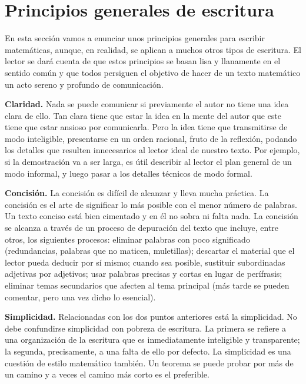 \section{Principios generales de escritura}

En esta sección vamos a enunciar unos principios generales para escribir matemáticas, aunque, en realidad, se aplican a muchos otros tipos de escritura. El lector se dará cuenta de que estos principios se basan lisa y llanamente en el sentido común y que todos persiguen el objetivo de hacer de un texto matemático un acto sereno y profundo de comunicación.

\hspace{5mm}\textbf{Claridad.}
Nada se puede comunicar si previamente el autor no tiene una idea clara de ello.
Tan clara tiene que estar la idea en la mente del autor que este tiene que estar ansioso por comunicarla.
Pero la idea tiene que transmitirse de modo inteligible, presentarse en un orden racional, fruto de la reflexión, podando los detalles que resulten innecesarios al lector ideal de nuestro texto.
Por ejemplo, si la demostración va a ser larga, es útil describir al lector el plan general de un modo informal, y luego pasar a los detalles técnicos de modo formal.

\hspace{5mm}\textbf{Concisión.}
La concisión es difícil de alcanzar y lleva mucha práctica.
La concisión es el arte de significar lo más posible con el menor número de palabras.
Un texto conciso está bien cimentado y en él no sobra ni falta nada.
La concisión se alcanza a través de un proceso de depuración del texto que incluye, entre otros, los siguientes procesos:
eliminar palabras con poco significado (redundancias, palabras que no maticen, muletillas);
descartar el material que el lector pueda deducir por sí mismo;
cuando sea posible, sustituir subordinadas adjetivas por adjetivos;
usar palabras precisas y cortas en lugar de perífrasis;
eliminar temas secundarios que afecten al tema principal (más tarde se pueden comentar, pero una vez dicho lo esencial).

\hspace{5mm}\textbf{Simplicidad.}
Relacionadas con los dos puntos anteriores está la simplicidad.
No debe confundirse simplicidad con pobreza de escritura.
La primera se refiere a una organización de la escritura que es inmediatamente inteligible y transparente;
la segunda, precisamente, a una falta de ello por defecto.
La simplicidad es una cuestión de estilo matemático también.
Un teorema se puede probar por más de un camino y a veces el camino más corto es el preferible.

